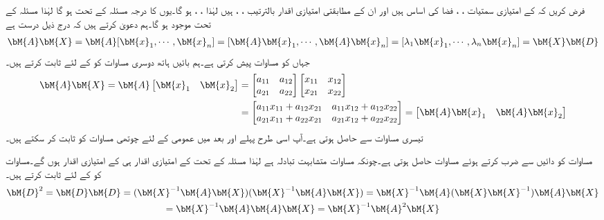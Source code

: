 
فرض کریں کہ  کے امتیازی سمتیات ،  ، فضا  کی اساس ہیں اور ان کے مطابقتی امتیازی اقدار بالترتیب ، ، ہیں لہٰذا ، ، ہو گا۔یوں  کا درجہ مسئلہ  کے تحت  ہو گا لہٰذا مسئلہ  کے تحت   موجود ہو گا۔ہم دعویٰ کرتے ہیں کہ درج ذیل درست ہے
\begin{align}\label{مساوات_امتیازی_وتری_حصول_پ}
\bM{A}\bM{X}=\bM{A}[\bM{x}_1,\cdots,\bM{x}_n]=[\bM{A}\bM{x}_1,\cdots,\bM{A}\bM{x}_n]=[\lambda_1\bM{x}_1,\cdots,\lambda_n\bM{x}_n]=\bM{X}\bM{D}
\end{align}
جہاں  کو مساوات  پیش کرتی ہے۔ہم بائیں ہاتھ دوسری مساوات کو  کے لئے ثابت کرتے ہیں۔
\begin{align*}
\bM{A}\bM{X}=\bM{A}\begin{bmatrix}\bM{x}_1\quad \bM{x}_2\end{bmatrix}&=\begin{bmatrix}a_{11}\quad a_{12}\\a_{21}\quad a_{22}  \end{bmatrix}\begin{bmatrix}x_{11}\quad x_{12}\\x_{21}\quad x_{22}  \end{bmatrix}\\
&=\begin{bmatrix} a_{11}x_{11}+a_{12}x_{21}\quad a_{11}x_{12}+a_{12}x_{22} \\ a_{21}x_{11}+a_{22}x_{21}\quad a_{21}x_{12}+a_{22}x_{22}\end{bmatrix}=\begin{bmatrix} \bM{A}\bM{x}_1\quad \bM{A}\bM{x}_2 \end{bmatrix}
\end{align*}
تیسری مساوات  سے حاصل ہوتی ہے۔آپ اسی طرح پہلے  اور بعد میں عمومی  کے لئے چوتھی مساوات کو ثابت کر سکتے ہیں۔

مساوات  کو دائیں  سے ضرب کرتے ہوئے مساوات  حاصل ہوتی ہے۔چونکہ مساوات  متشابہت تبادلہ ہے  لہٰذا مسئلہ  کے تحت  کے امتیازی اقدار ہی  کے امتیازی اقدار  ہوں گے۔مساوات  کو  کے لئے ثابت کرتے ہیں۔
\begin{multline*}
\bM{D}^2=\bM{D}\bM{D}=(\bM{X}^{-1}\bM{A}\bM{X})(\bM{X}^{-1}\bM{A}\bM{X})=\bM{X}^{-1}\bM{A}(\bM{X}\bM{X}^{-1})\bM{A}\bM{X}\\
=\bM{X}^{-1}\bM{A}\bM{A}\bM{X}=\bM{X}^{-1}\bM{A}^2\bM{X}
\end{multline*}

